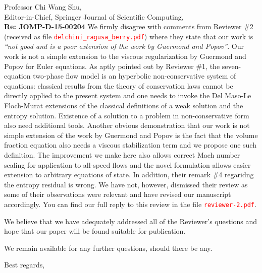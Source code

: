 \documentclass[11pt]{letter}
\newcommand{\tcr}[1]{\textcolor{red}{#1}}
\begin{document}
\begin{letter}{Professor Chi Wang Shu, \\  Editor-in-Chief, Springer Journal of Scientific Computing,\\
\textbf{Re: JOMP-D-15-00204}}
We firmly disagree with comments from Reviewer \#2 (received as file \tcr{{\tt delchini\_ragusa\_berry.pdf}})
where they state that our work is {\it ``not good and is a poor extension of the work by Guermond and Popov''}.
Our work is not a simple extension to the viscous regularization by Guermond and Popov for Euler equations. 
As aptly pointed out by Reviewer \#1, the seven-equation two-phase flow model is an hyperbolic non-conservative 
system of equations: classical results from the theory of conservation laws cannot be directly
applied to the present system and one needs to invoke the Del Maso-Le Floch-Murat extensions of the 
classical definitions of a weak solution and the entropy solution. Existence of a solution to
a problem in non-conservative form also need additional tools. Another obvious demonstration that our
work is not simple extension of the work by Guermond and Popov is the fact that the volume fraction equation
also needs a  viscous stabilization term and we propose one such definition. 
The improvement we make here also allows correct Mach number scaling for application to all-speed flows and
the novel formulation allows easier extension to arbitrary equations of state.
In addition, their remark \#4 regaridng the entropy residual is wrong. 
We have not, however, dismissed their review as some of their observations were relevant and have revised
our manuscript accordingly. You can find our full reply to this review in the file \tcr{{\tt reviewer-2.pdf}}.

We believe that we have adequately addressed all of the Reviewer's questions and hope that our paper will be found 
suitable for publication.

%
\bigskip

We remain available for any further questions, should there be any.



\closing{Best regards, }

\end{letter}
\end{document}
